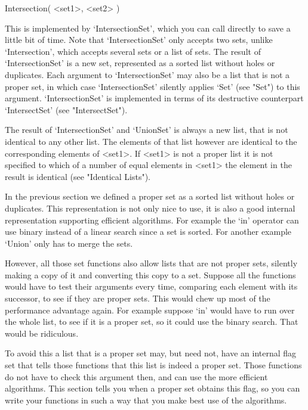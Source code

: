 \>Intersection( <set1>, <set2> )

This is implemented by `IntersectionSet', which you can call  directly to
save a little bit of time.  Note that `IntersectionSet'  only accepts two
sets, unlike `Intersection',  which  accepts several sets  or  a list  of
sets.  The  result of `IntersectionSet' is  a new  set,  represented as a
sorted  list     without  holes   or  duplicates.   Each   argument    to
`IntersectionSet' may also be a list  that is not  a proper set, in which
case  `IntersectionSet'  silently  applies  `Set' (see  "Set")    to this
argument.  `IntersectionSet' is implemented in  terms of its  destructive
counterpart `IntersectSet' (see "IntersectSet").

The result of `IntersectionSet' and `UnionSet' is always a new list, that
is not  identical to any other list.   The elements of that  list however
are identical to the corresponding elements of <set1>.   If <set1> is not
a proper list it is not specified to which of a number  of equal elements
in <set1> the element in the result is identical (see "Identical Lists").

\null

In the previous section we defined a proper  set as a sorted list without
holes or duplicates.  This representation is not  only nice to use, it is
also a good internal representation supporting efficient algorithms.  For
example the `in' operator can use binary instead of a linear search since
a set is sorted.  For another example `Union' only has to merge the sets.

However, all  those set functions  also allow lists that are  not  proper
sets,  silently making  a copy  of it and  converting this copy to a set.
Suppose all the functions would have to test  their arguments every time,
comparing  each element  with its  successor, to see if  they  are proper
sets.  This would chew up most  of  the performance advantage again.  For
example suppose `in' would have to run  over the whole list, to see if it
is  a  proper set, so  it could  use the  binary search.   That  would be
ridiculous.

To avoid this a  list that is  a proper set  may, but need  not, have  an
internal flag set that tells  those functions that  this list is indeed a
proper set.  Those functions do not have to check this argument then, and
can use the more  efficient algorithms.  This  section tells  you  when a
proper set obtains this flag,  so you can write your  functions in such a
way that you make best use of the algorithms.

